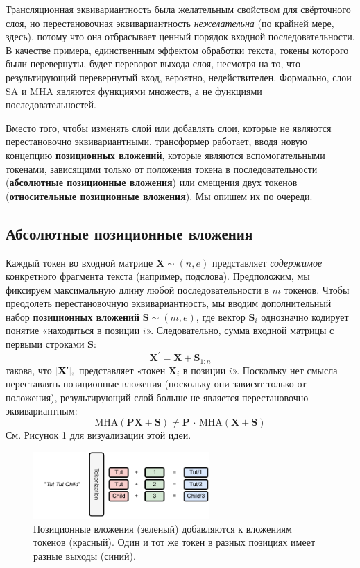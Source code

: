 Трансляционная эквивариантность была желательным свойством для свёрточного слоя, но перестановочная эквивариантность \textit{нежелательна} (по крайней мере, здесь), потому что она отбрасывает ценный порядок входной последовательности. В качестве примера, единственным эффектом обработки текста, токены которого были перевернуты, будет переворот выхода слоя, несмотря на то, что результирующий перевернутый вход, вероятно, недействителен. Формально, слои SA и MHA являются функциями множеств, а не функциями последовательностей.

Вместо того, чтобы изменять слой или добавлять слои, которые не являются перестановочно эквивариантными, трансформер работает, вводя новую концепцию \textbf{позиционных вложений}, которые являются вспомогательными токенами, зависящими только от положения токена в последовательности (\textbf{абсолютные позиционные вложения}) или смещения двух токенов (\textbf{относительные позиционные вложения}). Мы опишем их по очереди.

\subsection{Абсолютные позиционные вложения}

Каждый токен во входной матрице $\mathbf{X} \sim (n,e)$ представляет \textit{содержимое} конкретного фрагмента текста (например, подслова). Предположим, мы фиксируем максимальную длину любой последовательности в $m$ токенов. Чтобы преодолеть перестановочную эквивариантность, мы вводим дополнительный набор \textbf{позиционных вложений} $\mathbf{S} \sim (m,e)$, где вектор $\mathbf{S}_i$ однозначно кодирует понятие «находиться в позиции $i$». Следовательно, сумма входной матрицы с первыми строками $\mathbf{S}$:
%
$$
\mathbf{X}^\prime =  \mathbf{X} + \mathbf{S}_{1:n}
$$
%
такова, что $\idx{\mathbf{X}^\prime}{i}$ представляет «токен $\mathbf{X}_i$ в позиции $i$».
%
Поскольку нет смысла переставлять позиционные вложения (поскольку они зависят только от положения), результирующий слой больше не является перестановочно эквивариантным:
%
$$
\text{MHA}(\mathbf{P}\mathbf{X} + \mathbf{S}) \neq \mathbf{P}\,\cdot\,\text{MHA}(\mathbf{X}+\mathbf{S})
$$
%
См. Рисунок \ref{fig:positional_embeddings} для визуализации этой идеи. 

\begin{figure}
    \centering
    \includegraphics[width=0.6\textwidth]{images/positional_embeddings}
    \caption{Позиционные вложения ({\color{drawgreen!30}зеленый}) добавляются к вложениям токенов ({\color{drawred!30}красный}). Один и тот же токен в разных позициях имеет разные выходы ({\color{drawblue!30}синий}).}
    \label{fig:positional_embeddings}
\end{figure}

